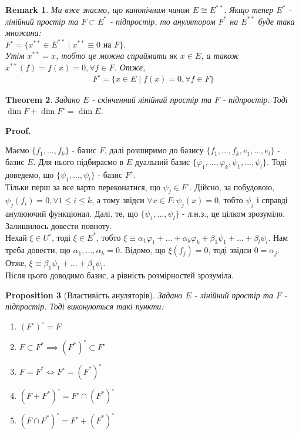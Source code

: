 \documentclass[a4paper, 10pt]{article}
\makeatletter
\theoremstyle{theoremdd}
\newtheorem{theorem}{Theorem}[subsection]
\newtheorem{proposition}[theorem]{Proposition}
\newtheorem{remark}[theorem]{Remark}
\renewenvironment{proof}[1][Proof.\\]{\par
\pushQED{\hfill \qed}%
\normalfont \topsep6\p@\@plus6\p@\relax
\trivlist
\item\relax
{\bfseries
#1\@addpunct{.}}\hspace\labelsep\ignorespaces
}{%
\popQED\endtrivlist\@endpefalse
}
\makeatother
\begin{document}
\begin{remark}
Ми вже знаємо, що канонічним чином $E \cong E^{**}$. Якщо тепер $E^*$ - лінійний простір та $F \subset E^*$ - підпростір, то анулятором $F^{*}$ на $E^{**}$ буде така множина:\\
$F^\circ = \{ x^{**} \in E^{**} \mid x^{**} \equiv 0 \text{ на }F \}$.\\
Утім $x^{**} = x$, тобто це можна сприймати як $x \in E$, а також $x^{**}(f) = f(x) = 0, \forall f \in F$. Отже,
\begin{align*}
F^\circ = \{ x \in E \mid f(x) = 0, \forall f \in F \}
\end{align*}
\end{remark}

\begin{theorem}
Задано $E$ - скінченний лінійний простір та $F$ - підпростір. Тоді \\ $\dim F + \dim F^\circ = \dim E$.
\end{theorem}

\begin{proof}
Маємо $\{f_1,\dots,f_k\}$ - базис $F$, далі розширимо до базису $\{f_1,\dots,f_k,e_1,\dots,e_l\}$ - базис $E$. Для нього підбираємо в $E$ дуальний базис $\{\varphi_1,\dots,\varphi_k,\psi_1,\dots,\psi_l\}$. Тоді доведемо, що $\{\psi_1,\dots,\psi_l\}$ - базис $F^\circ$.
\bigskip \\
Тільки перш за все варто переконатися, що $\psi_j \in F^\circ$. Дійсно, за побудовою, $\psi_j(f_i) = 0, \forall 1 \leq i \leq k$, а тому звідси $\forall x \in F: \psi_j(x) = 0$, тобто $\psi_j$ і справді анулюючий функціонал. Далі, те, що $\{\psi_1,\dots,\psi_l\}$ - л.н.з., це цілком зрозуміло. Залишилось довести повноту.\\
Нехай $\xi \in U^\circ$, тоді $\xi \in E^*$, тобто $\xi \equiv \alpha_1 \varphi_1 + \dots + \alpha_k \varphi_k + \beta_1 \psi_1 + \dots + \beta_l \psi_l$. Нам треба довести, що $\alpha_1,\dots,\alpha_k = 0$. Відомо, що $\xi(f_j) = 0$, тоді звідси $0 = \alpha_j$. Отже, $\xi \equiv \beta_1 \psi_1 + \dots + \beta_1  \psi_l$.\\
Після цього доводимо базис, а рівність розмірностей зрозуміла.
\end{proof}

\begin{proposition}[Властивість ануляторів]
Задано $E$ - лінійний простір та $F$ - підпростір. Тоді виконуються такі пункти:
\begin{enumerate}[nosep, wide=0pt, label={\arabic*)}]
\item $(F^{\circ})^{\circ} = F$
\item $F \subset F^* \implies (F^*)^\circ \subset F^\circ$
\item $F = F^* \iff F^\circ = (F^*)^\circ$
\item $(F+F^*)^\circ = F^\circ \cap (F^*)^\circ$
\item $(F \cap F^*)^\circ = F^\circ + (F^*)^\circ$
\end{enumerate}
\end{proposition}
\end{document}
